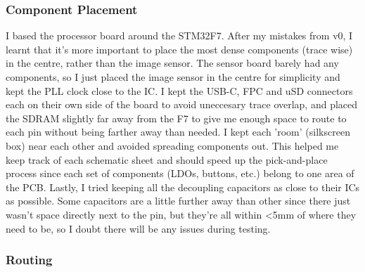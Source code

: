 \documentclass[10pt]{article}
\newcommand{\nl}{\newline \newline}
\begin{document}
\subsubsection{Component Placement}
I based the processor board around the STM32F7. After my mistakes from v0, I learnt that it's more important to place the most dense components (trace wise) in the centre, rather than the image sensor.
The sensor board barely had any components, so I just placed the image sensor in the centre for simplicity and kept the PLL clock close to the IC.
\nl
I kept the USB-C, FPC and uSD connectors each on their own side of the board to avoid uneccesary trace overlap, and placed the SDRAM slightly far away from the F7 to give me enough space to route to each pin without being farther away than needed.
\nl
I kept each 'room' (silkscreen box) near each other and avoided spreading components out. This helped me keep track of each schematic sheet and should speed up the pick-and-place process since each set of components (LDOs, buttons, etc.) belong to one area of the PCB.
\nl
Lastly, I tried keeping all the decoupling capacitors as close to their ICs as possible. Some capacitors are a little further away than other since there just wasn't space directly next to the pin, but they're all within <5mm of where they need to be, so I doubt there will be any issues during testing.

\subsubsection{Routing}
\end{document}

